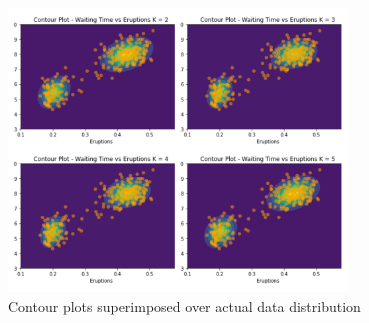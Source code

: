 \documentclass[11pt]{article}
\begin{document}
\begin{figure}[H]
  \centering
  \includegraphics[width = 0.8\textwidth]{6plots.jpg}
  \caption{Contour plots superimposed over actual data distribution}
\end{figure}
\end{document}
